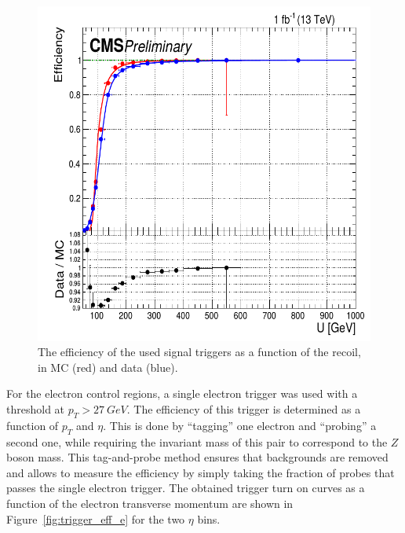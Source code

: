 \begin{figure}[ht]
  \centering
 \includegraphics[width=.61\textwidth]{monojet_trigger.png} 
 \caption{The efficiency of the used signal triggers as a function of the recoil, in MC (red) and data (blue).}
 \label{fig:trigger_eff}
\end{figure}

For the electron control regions, a single electron trigger was used with a threshold at $p_T > \SI{27}{GeV}$. The efficiency of this trigger is determined as a function of $p_T$ and $\eta$. This is done by ``tagging'' one electron and ``probing'' a second one, while requiring the invariant mass of this pair to correspond to the $Z$ boson mass. This tag-and-probe method ensures that backgrounds are removed and allows to measure the efficiency by simply taking the fraction of probes that passes the single electron trigger. The obtained trigger turn on curves as a function of the electron transverse momentum are shown in Figure~\ref{fig:trigger_eff_e} for the two $\eta$ bins.

